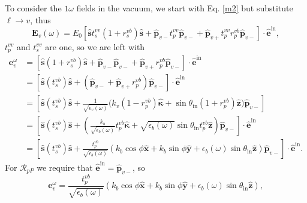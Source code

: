 To consider the $1\omega$ fields in the vacuum, we start with Eq. \eqref{m2}
but substitute $\ell\rightarrow v$, thus
\begin{equation*}
\mathbf{E}_{v}(\omega)= E_{0}
\left[
  \hat{\mathbf{s}} t^{vv}_s(1+r^{v b}_s)\hat{\mathbf{s}}
+ \hat{\mathbf{p}}_{v-}t^{vv}_{p}\hat{\mathbf{p}}_{v-}
+ \hat{\mathbf{p}}_{v+}t^{vv}_{p}r^{v b}_{p}\hat{\mathbf{p}}_{v-}
\right]
\cdot\hat{\mathbf{e}}^{\mathrm{in}}
,
\end{equation*}
$t_{p}^{vv}$ and $t_{s}^{vv}$ are one, so we are left with
\begin{equation*}
\begin{split}
\mathbf{e}^{\omega}_{v}
&= \left[
  \hat{\mathbf{s}}(1+r^{v b}_s)\hat{\mathbf{s}}
+ \hat{\mathbf{p}}_{v-}\hat{\mathbf{p}}_{v-}
+ \hat{\mathbf{p}}_{v+}r^{v b}_{p}\hat{\mathbf{p}}_{v-}
\right]
\cdot\hat{\mathbf{e}}^{\mathrm{in}}\\
&= \left[
  \hat{\mathbf{s}}(t^{vb}_s)\hat{\mathbf{s}}
+ (\hat{\mathbf{p}}_{v-} + \hat{\mathbf{p}}_{v+}r^{v b}_{p})
  \hat{\mathbf{p}}_{v-}
\right]
\cdot\hat{\mathbf{e}}^{\mathrm{in}}\\
&= \left[
  \hat{\mathbf{s}}(t^{vb}_s)\hat{\mathbf{s}}
+ \frac{1}{\sqrt{\epsilon_{v}(\omega)}}
\big(
  k_{v}(1 - r^{vb}_{p})\hat{\boldsymbol{\kappa}}
+ \sin\theta_{\mathrm{in}}(1 + r^{vb}_{p})
\hat{\mathbf{z}}
\big)
  \hat{\mathbf{p}}_{v-}
\right]\\
&= \left[
  \hat{\mathbf{s}}(t^{vb}_s)\hat{\mathbf{s}}
+ \left(
  \frac{k_{b}}{\sqrt{\epsilon_{b}(\omega)}}
  t^{v b}_{p}\hat{\boldsymbol{\kappa}} 
+ \sqrt{\epsilon_{b}(\omega)}\sin\theta_{\mathrm{in}}
  t^{v b}_{p}\hat{\mathbf{z}}
  \right)
  \hat{\mathbf{p}}_{v-}
\right]
\cdot\hat{\mathbf{e}}^{\mathrm{in}}\\
&= \left[
  \hat{\mathbf{s}}(t^{vb}_s)\hat{\mathbf{s}}
+ \frac{t^{v b}_{p}}{\sqrt{\epsilon_{b}(\omega)}}\left(
  k_{b}\cos\phi\hat{\mathbf{x}}
+ k_{b}\sin\phi\hat{\mathbf{y}}
+ \epsilon_{b}(\omega)\sin\theta_{\mathrm{in}}\hat{\mathbf{z}}
  \right)
  \hat{\mathbf{p}}_{v-}
\right]
\cdot\hat{\mathbf{e}}^{\mathrm{in}}.
\end{split}
\end{equation*}
For $\mathcal{R}_{pP}$ we require that $\hat{\mathbf{e}}^{\mathrm{in}} =
\hat{\mathbf{p}}_{v-}$, so
\begin{equation*}
\mathbf{e}^{\omega}_{v} =
\frac{t^{v b}_{p}}{\sqrt{\epsilon_{b}(\omega)}}
\left(
  k_{b}\cos\phi\hat{\mathbf{x}}
+ k_{b}\sin\phi\hat{\mathbf{y}}
+ \epsilon_{b}(\omega)\sin\theta_{\mathrm{in}}\hat{\mathbf{z}}
  \right),
\end{equation*}

